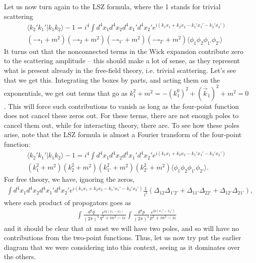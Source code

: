 \documentclass{../mathnotes}
\begin{document}
Let us now turn again to the LSZ formula, where the 1 stands for trivial scattering
\begin{align*}
    \langle k_2'k_1'|k_1k_2\rangle-1=i^4\int d^4x_1d^4x_2d^4x_1'd^4x_2'e^{i(k_1x_1+k_2x_2-k_1'x_1'-k_2'x_2')}\\
    (-\square_1+m^2)(-\square_2+m^2)(-\square_{1'}+m^2)(-\square_{2'}+m^2)\langle\phi_1\phi_2\phi_{1'}\phi_{2'}\rangle
\end{align*}
It turns out that the nonconnected terms in the Wick expansion contribute zero to the scattering amplitude -- this should make a lot of sense,
as they represent what is present already in the free-field theory, i.e. trivial scattering. Let's see that we get this. Integrating the boxes by
parts, and acting them on the exponentials, we get out terms that go as $k_1^2+m^2=-(k_1^0)^2+(\vec{k}_1)^2+m^2=0$. This will force such
contributions to vanish as long as the four-point function does not cancel these zeros out. For these terms, there are not enough poles to
cancel them out, while for interacting theory, there are. To see how these poles arise, note that the LSZ formula is almost a Fourier transform
of the four-point function:
\begin{align*}
    \langle k_2'k_1'|k_1k_2\rangle-1=i^4\int d^4x_1d^4x_2d^4x_1'd^4x_2'e^{i(k_1x_1+k_2x_2-k_1'x_1'-k_2'x_2')}\\
    (k_1^2+m^2)(k_2^2+m^2)(k_{1'}^2+m^2)(k_{2'}^2+m^2)\langle\phi_1\phi_2\phi_{1'}\phi_{2'}\rangle.
\end{align*}
For free theory, we have, ignoring the zeros,
\begin{align*}
    \int d^4x_1d^4x_2d^4x_{1}'d^4x_2'e^{i(k_1x_1+k_2x_2-k_1'x_1'-k_2'x_2')}\frac{1}{i^2}\left(\Delta_{12}\Delta_{1'2'}+\Delta_{11'}\Delta_{22'}+\Delta_{12'}\Delta_{21'}  \right),
\end{align*}
where each product of propogators goes as
\begin{align*}
    \int \frac{d^4q}{(2\pi)^4}\frac{e^{iq(x_1-x_2)}}{q^2+m^2-i\varepsilon}\int \frac{d^4p}{(2\pi)^4}\frac{e^{ip(x_1'-x_2')}}{p^2+m^2-i\varepsilon}
\end{align*}
and it should be clear that at most we will have two poles, and so will have no contributions from the two-point functions. Thus, let us now try
put the earlier diagram that we were considering into this context, seeing as it dominates over the others.
\end{document}
